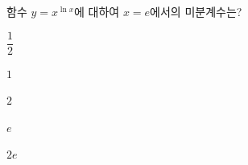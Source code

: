 함수 $y=x^{\ln x}$에 대하여 $x=e$에서의 미분계수는?
\begin{choices32}{\rule[-3ex]{0pt}{8ex}$\dfrac{1}{2}$}{\rule[-3ex]{0pt}{8ex}$1$}{\rule[-3ex]{0pt}{8ex}$2$}{\rule[-3ex]{0pt}{8ex}$e$}{\rule[-3ex]{0pt}{8ex}$2e$}\end{choices32}
